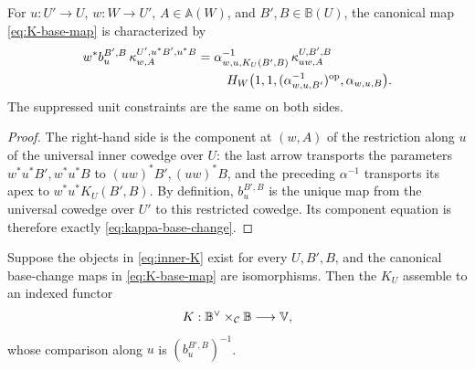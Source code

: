 \begin{lemma}
\label{lem:kappa-base-change}
For \(u:U'\to U\), \(w:W\to U'\), \(A\in\mathbb A(W)\), and
\(B',B\in\mathbb B(U)\), the canonical map
\cref{eq:K-base-map} is characterized by
\begin{equation}
\begin{split}
 w^*b_u^{B',B}\,
 \kappa^{U',u^*B',u^*B}_{w,A}
 ={}&
 \alpha^{-1}_{w,u,K_U(B',B)}\,
 \kappa^{U,B',B}_{uw,A}\\
 &{}\quad
 H_W\bigl(1,1,
   (\alpha^{-1}_{w,u,B'})^{\mathrm{op}},
   \alpha_{w,u,B}\bigr).
\end{split}
\label{eq:kappa-base-change}
\end{equation}
The suppressed unit constraints are the same on both sides.
\end{lemma}

\begin{proof}
The right-hand side is the component at \((w,A)\) of the restriction along
\(u\) of the universal inner cowedge over \(U\): the last arrow transports
the parameters \(w^*u^*B',w^*u^*B\) to
\((uw)^*B',(uw)^*B\), and the preceding \(\alpha^{-1}\) transports its
apex to \(w^*u^*K_U(B',B)\).  By definition,
\(b_u^{B',B}\) is the unique map from the universal cowedge over \(U'\) to
this restricted cowedge.  Its component equation is therefore exactly
\cref{eq:kappa-base-change}.
\end{proof}

\begin{lemma}
\label{lem:inner-indexed-functor}
Suppose the objects in \cref{eq:inner-K} exist for every \(U,B',B\), and
the canonical base-change maps in \cref{eq:K-base-map} are isomorphisms.
Then the \(K_U\) assemble to an indexed functor
\[
  K:\mathbb B^{\vee}\times_{\mathcal{C}}\mathbb B\longrightarrow\mathbb{V},
\]
whose comparison along \(u\) is \((b_u^{B',B})^{-1}\).
\end{lemma}


